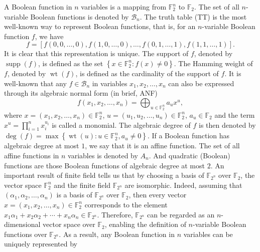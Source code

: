 \documentclass[preprint,10pt]{elsarticle}
\newcommand{\F}{\mathbb{F}}
\newcommand{\0}{\textbf{0}}
\newcommand{\1}{\textbf{1}}
\newcommand{\wt}{\operatorname{wt}}
\theoremstyle{plain}
\begin{document}
    A Boolean function in $n$ variables is a mapping from $\F_2^n$ to $\F_2$.
    The set of all $n$-variable Boolean functions is denoted by $\mathcal{B}_n$.
    The truth table (TT) is the most well-known way to represent Boolean functions, that is, 
    for an $n$-variable Boolean function $f$, we have 
    \[f=\left[ f(0,0,\dots,0),f(1,0,\dots,0),\dots,f(0,1,\dots,1),f(1,1,\dots,1) \right].\]
    It is clear that this representation is unique.
    The support of $f$, denoted by $\operatorname{supp}(f)$, is defined as the set $\left\{ x\in\F_2^n : f(x)\ne 0 \right\}$.
    The Hamming weight of $f$, denoted by $\wt(f)$, is defined as the cardinality of the support of $f$.
    It is well-known that any $f\in\mathcal{B}_n$ in variables $x_1,x_2,\dots,x_n$ can also be expressed through its algebraic normal form (in brief, ANF)
    \[f(x_1,x_2,\dots,x_n) = \bigoplus_{u\in\F_2^n}a_ux^u,\]
    where $x=(x_1,x_2,\dots,x_n)\in\F_2^n$, $u=(u_1,u_2,\dots,u_n)\in\F_2^n$, $a_u\in\F_2$ and the term $x^{u}=\prod_{i=1}^nx_i^{u_i}$ is called a monomial.
    The algebraic degree of $f$ is then denoted by $\deg(f)=\max\left\{ \wt(u) :  u\in\F_2^n, a_u\ne 0 \right\}$.
    If a Boolean function has algebraic degree at most $1$, we say that it is an affine function.
    The set of all affine functions in $n$ variables is denoted by $A_n$.
    And quadratic (Boolean) functions are those Boolean functions of algebraic degree at most $2$.
    An important result of finite field tells us that by choosing a basis of $\F_{2^n}$ over $\F_2$, the vector space $\F_2^n$ and the finite field $\F_{2^n}$ are isomorphic.
    Indeed, assuming that $(\alpha_1,\alpha_2,\dots,\alpha_n)$ is a basis of $\F_{2^n}$ over $\F_2$, then every vector $x=(x_1,x_2,\dots,x_n)\in\F_2^n$ corresponds to the element $x_1\alpha_1+x_2\alpha_2+\cdots+x_n\alpha_n\in\F_{2^n}$. 
    Therefore, $\F_{2^n}$ can be regarded as an $n$-dimensional vector space over $\F_2$, enabling the definition of $n$-variable Boolean functions over $\F_{2^n}$.
    As a result, any Boolean function in $n$ variables can be uniquely represented by 
\end{document}
